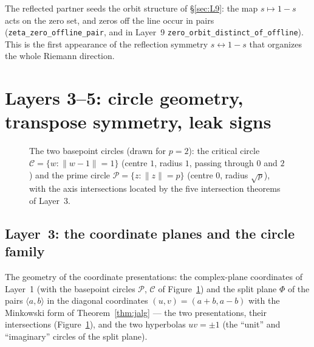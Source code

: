 \documentclass{article}
\begin{document}
The reflected partner seeds the orbit structure of
\S\ref{sec:L9}: the map $s\mapsto 1-s$ acts on the zero set, and zeros off
the line occur in pairs (\texttt{zeta\_zero\_offline\_pair}, and in
Layer~9 \texttt{zero\_orbit\_distinct\_of\_offline}). This is the first
appearance of the reflection
symmetry $s\leftrightarrow 1-s$ that organizes the whole Riemann direction.

\section{Layers 3--5: circle geometry, transpose symmetry, leak signs}
\label{sec:L3}

\begin{figure}[h]
\centering
{}
\caption{The two basepoint circles (drawn for $p=2$): the critical circle
$\mathcal C=\{w:\|w-1\|=1\}$ (centre $1$, radius $1$, passing through $0$
and $2$) and the prime circle
$\mathcal P=\{z:\|z\|=p\}$ (centre $0$, radius $\sqrt p$), with the axis
intersections located by the five intersection theorems of Layer~3.}
\label{fig:circles}
\end{figure}

\subsection{Layer~3: the coordinate planes and the circle family}
\label{sec:L3a}

The geometry of the coordinate presentations: the
complex-plane coordinates of Layer~1 (with the basepoint circles
$\mathcal P$, $\mathcal C$ of Figure~\ref{fig:circles}) and the
split plane $\Phi$ of the pairs $\langle a,b\rangle$ in the diagonal
coordinates $(u,v)=(a+b,a-b)$ with the Minkowski form of
Theorem~\ref{thm:jalg} --- the two presentations, their intersections
(Figure~\ref{fig:circles}), and the two
hyperbolas $uv=\pm1$ (the ``unit'' and ``imaginary'' circles of the split
plane).
\end{document}

